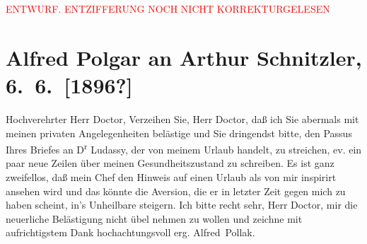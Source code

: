 
\begin{center}
            \textcolor{red}{ENTWURF. ENTZIFFERUNG NOCH NICHT KORREKTURGELESEN}
                      \end{center}
            
               \section[Alfred Polgar an Arthur Schnitzler, 6. 6. {[}1896?{]}]{ Alfred Polgar an Arthur Schnitzler, 6. 6. {[}1896?{]}}\nopagebreak{}\rehead{ }\begin{ledgroupsized}[t]{13cm}\normalsize\beginnumbering{} \toendnotes[C]{\smallbreak\pagebreak[2]} 
\toendnotes[C]{\smallbreak}\pstart{}{\pb}Hochverehrter Herr
                        Doctor,\pend\pstart
           Verzeihen Sie, Herr Doctor, daß ich Sie abermals mit meinen privaten
                    Angelegenheiten belästige und Sie dringendst bitte, den Passus Ihres Briefes an
                        D\textsuperscript{r}{ }Ludassy, der von meinem Urlaub handelt, zu
                    streichen, ev. ein paar neue Zeilen über meinen Gesundheitszustand zu
                    schreiben.\pend
           \pstart
           Es ist ganz zweifellos, daß mein Chef den Hinweis auf einen Urlaub als von mir
                    inspirirt ansehen wird und das könnte die Aversion, die er in letzter Zeit gegen
                    mich zu haben scheint, in’s Unheilbare steigern.\pend
           \pstart
           Ich bitte recht sehr, Herr Doctor, mir die neuerliche Belästigung nicht übel
                    nehmen zu wollen und zeichne mit aufrichtigstem Dank\pend
           \pstart hochachtungsvoll erg. \spacefill\mbox{Alfred Pollak.}\pend{}\pstart
           \label{K_L00550_1v}
\end{ledgroupsized}
